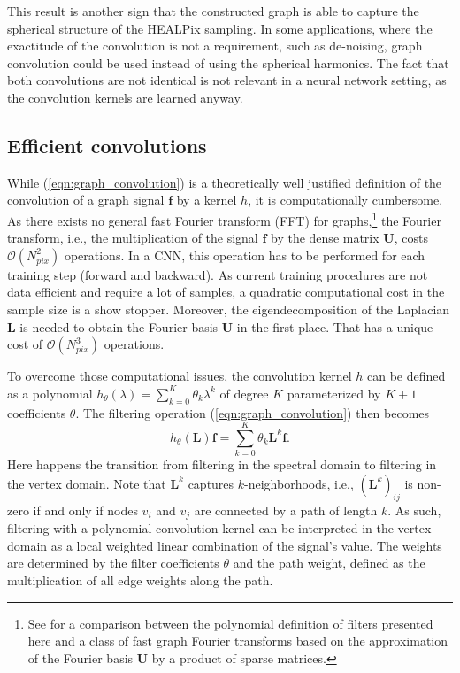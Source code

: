 \documentclass[final,twocolumn,3p,times,authoryear]{elsarticle}
\newcommand{\todo}[1]{{\color[rgb]{.6,.1,.6}{#1}}}
\newcommand{\eqnref}[1]{(\ref{eqn:#1})}
\renewcommand{\b}[1]{{\bm{#1}}}   %
\newcommand{\1}{\b{1}}              %
\newcommand{\0}{\b{0}}              %
\renewcommand{\L}{\b{L}}
\newcommand{\U}{\b{U}}
\newcommand{\f}{\b{f}}
\newcommand{\bO}{\mathcal{O}}
\begin{document}
This result is another sign that the constructed graph is able to capture the spherical
structure of the HEALPix sampling. In some applications, where the
exactitude of the convolution is not a requirement, such as de-noising, graph convolution could be used instead of using the spherical harmonics.
The fact that both convolutions are not identical is not relevant in a neural network setting, as the convolution kernels are learned anyway.

\subsection{Efficient convolutions}
\label{sec:efficient_convolution}

While \eqnref{graph_convolution} is a theoretically well justified definition of the convolution of a graph signal $\f$ by a kernel $h$, it is computationally cumbersome. As there exists no general fast Fourier transform (FFT) for graphs,\footnote{See \citep{le2018fgft} for a comparison between the polynomial definition of filters presented here and a class of fast graph Fourier transforms based on the approximation of the Fourier basis $\U$ by a product of sparse matrices.} the Fourier transform, i.e., the multiplication of the signal $\f$ by the dense matrix $\U$, costs $\bO(N_{pix}^2)$ operations. In a CNN, this operation has to be performed for each training step (forward and backward). As current training procedures are not data efficient and require a lot of samples, a quadratic computational cost in the sample size is a show stopper.
Moreover, the eigendecomposition of the Laplacian $\L$ is needed to obtain the Fourier basis $\U$ in the first place. That has a unique cost of $\bO(N_{pix}^3)$ operations.

To overcome those computational issues, the convolution kernel $h$ can be defined as a polynomial $h_\theta(\lambda) = \sum_{k=0}^K \theta_k \lambda^k$ of degree $K$ parameterized by $K+1$ coefficients $\theta$. The filtering operation \eqnref{graph_convolution} then becomes
\begin{equation} \label{eqn:graph_convolution_polynomial}
	h_\theta(\L) \f = \sum_{k=0}^K \theta_k \L^k \f.
\end{equation}
Here happens the transition from filtering in the spectral domain to filtering in the vertex domain. Note that $\L^k$ captures $k$-neighborhoods, i.e., $(\L^k)_{ij}$ is non-zero if and only if nodes $v_i$ and $v_j$ are connected by a path of length $k$. As such, filtering with a polynomial convolution kernel can be interpreted in the vertex domain as a local weighted linear combination of the signal's value. The weights are determined by the filter coefficients $\theta$ and the path weight, defined as the multiplication of all edge weights along the path.
\todo{Better vertex domain explanation.}
\end{document}
